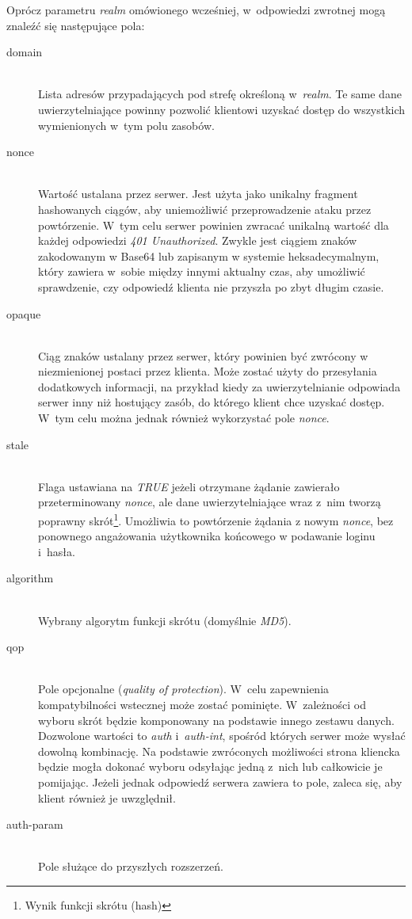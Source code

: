 \documentclass[11pt]{aghdpl}
\begin{document}
Oprócz parametru \emph{realm} omówionego wcześniej, w~odpowiedzi zwrotnej mogą znaleźć się następujące pola:
\begin{description}
\item[domain] \hfill \\
Lista adresów przypadających pod strefę określoną w~\emph{realm}. Te same dane uwierzytelniające powinny pozwolić klientowi uzyskać dostęp do wszystkich wymienionych w~tym polu zasobów.
\item[nonce] \hfill \\
Wartość ustalana przez serwer. Jest użyta jako unikalny fragment hashowanych ciągów, aby uniemożliwić przeprowadzenie ataku przez powtórzenie. W~tym celu serwer powinien zwracać unikalną wartość dla każdej odpowiedzi \emph{401 Unauthorized}. Zwykle jest ciągiem znaków zakodowanym w Base64 lub zapisanym w systemie heksadecymalnym, który zawiera w~sobie między innymi aktualny czas, aby umożliwić sprawdzenie, czy odpowiedź klienta nie przyszła po zbyt długim czasie.
\item[opaque] \hfill \\
Ciąg znaków ustalany przez serwer, który powinien być zwrócony w niezmienionej postaci przez klienta. Może zostać użyty do przesyłania dodatkowych informacji, na przykład kiedy za uwierzytelnianie odpowiada serwer inny niż hostujący zasób, do którego klient chce uzyskać dostęp. W~tym celu można jednak również wykorzystać pole \emph{nonce}.
\item[stale] \hfill \\
Flaga ustawiana na \emph{TRUE} jeżeli otrzymane żądanie zawierało przeterminowany \emph{nonce}, ale dane uwierzytelniające wraz z~nim tworzą poprawny skrót\footnote{Wynik funkcji skrótu (hash)}. Umożliwia to powtórzenie żądania z nowym \emph{nonce}, bez ponownego angażowania użytkownika końcowego w podawanie loginu i~hasła.
\item[algorithm] 
\hfill \\Wybrany algorytm funkcji skrótu (domyślnie \emph{MD5}).
\item[qop] \hfill \\
Pole opcjonalne (\emph{quality of protection}). W~celu zapewnienia kompatybilności wstecznej może zostać pominięte. W~zależności od wyboru skrót będzie komponowany na podstawie innego zestawu danych. Dozwolone wartości to \emph{auth} i~\emph{auth-int}, spośród których serwer może wysłać dowolną kombinację. Na podstawie zwróconych możliwości strona kliencka będzie mogła dokonać wyboru odsyłając jedną z~nich lub całkowicie je pomijając. Jeżeli jednak odpowiedź serwera zawiera to pole, zaleca się, aby klient również je uwzględnił.
\item[auth-param] \hfill \\
Pole służące do przyszłych rozszerzeń.
\end{description}
\end{document}

